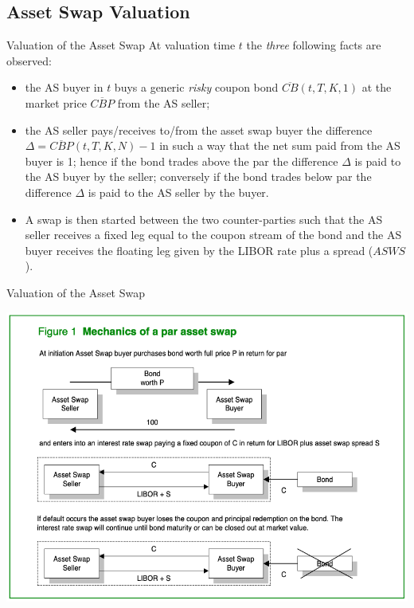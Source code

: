 \documentclass{beamer}
\begin{document}
\subsection{Asset Swap Valuation}
\begin{frame}{Valuation of the Asset Swap}
	At valuation time $t$ the \emph{three} following facts are observed:
	\begin{itemize}
		\item the AS buyer in $t$ buys a generic \emph{risky} coupon bond $\overline{CB}(t,T,K,1)$ at the market price $\overline{CBP}$ from the AS seller;
		\item the AS seller pays/receives to/from the asset swap buyer the difference $\Delta = \overline{CBP}(t,T,K,N)-1$ in such a way that the net sum paid from the AS buyer is 1; hence if the bond trades above the par the difference $\Delta$ is paid to the AS buyer by the seller; conversely if the bond trades below par the difference $\Delta$ is paid to the AS seller by the buyer.
		\item A swap is then started between the two counter-parties such that the AS seller receives a fixed leg equal to the coupon stream of the bond and the AS buyer receives the floating leg given by the LIBOR rate plus a spread ($ASWS$).
	\end{itemize}
\end{frame}

\begin{frame}{Valuation of the Asset Swap}
	\begin{center}
		\includegraphics[width=0.8\linewidth]{asset_swap}
	\end{center}
\end{frame}
\end{document}
